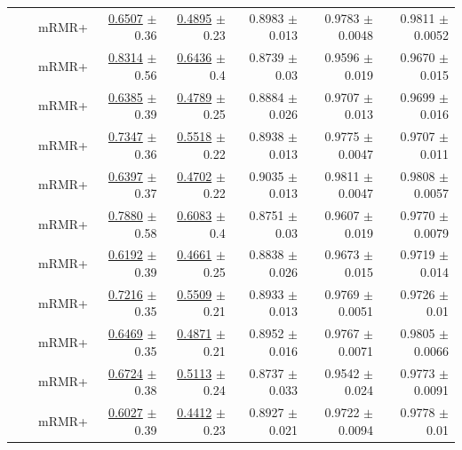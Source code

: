 \begin{longtable}{llp{}rrrrr}
 &  & mRMR+ & \underline{0.6507} {\scriptsize $\pm$ 0.36} & \underline{0.4895} {\scriptsize $\pm$ 0.23} & 0.8983 {\scriptsize $\pm$ 0.013} & 0.9783 {\scriptsize $\pm$ 0.0048} & 0.9811 {\scriptsize $\pm$ 0.0052} \\
 &  & mRMR+ & \underline{0.8314} {\scriptsize $\pm$ 0.56} & \underline{0.6436} {\scriptsize $\pm$ 0.4} & 0.8739 {\scriptsize $\pm$ 0.03} & 0.9596 {\scriptsize $\pm$ 0.019} & 0.9670 {\scriptsize $\pm$ 0.015} \\
 &  & mRMR+ & \underline{0.6385} {\scriptsize $\pm$ 0.39} & \underline{0.4789} {\scriptsize $\pm$ 0.25} & 0.8884 {\scriptsize $\pm$ 0.026} & 0.9707 {\scriptsize $\pm$ 0.013} & 0.9699 {\scriptsize $\pm$ 0.016} \\
 &  & mRMR+ & \underline{0.7347} {\scriptsize $\pm$ 0.36} & \underline{0.5518} {\scriptsize $\pm$ 0.22} & 0.8938 {\scriptsize $\pm$ 0.013} & 0.9775 {\scriptsize $\pm$ 0.0047} & 0.9707 {\scriptsize $\pm$ 0.011} \\
 &  & mRMR+ & \underline{0.6397} {\scriptsize $\pm$ 0.37} & \underline{0.4702} {\scriptsize $\pm$ 0.22} & 0.9035 {\scriptsize $\pm$ 0.013} & 0.9811 {\scriptsize $\pm$ 0.0047} & 0.9808 {\scriptsize $\pm$ 0.0057} \\
 &  & mRMR+ & \underline{0.7880} {\scriptsize $\pm$ 0.58} & \underline{0.6083} {\scriptsize $\pm$ 0.4} & 0.8751 {\scriptsize $\pm$ 0.03} & 0.9607 {\scriptsize $\pm$ 0.019} & 0.9770 {\scriptsize $\pm$ 0.0079} \\
 &  & mRMR+ & \underline{0.6192} {\scriptsize $\pm$ 0.39} & \underline{0.4661} {\scriptsize $\pm$ 0.25} & 0.8838 {\scriptsize $\pm$ 0.026} & 0.9673 {\scriptsize $\pm$ 0.015} & 0.9719 {\scriptsize $\pm$ 0.014} \\
 &  & mRMR+ & \underline{0.7216} {\scriptsize $\pm$ 0.35} & \underline{0.5509} {\scriptsize $\pm$ 0.21} & 0.8933 {\scriptsize $\pm$ 0.013} & 0.9769 {\scriptsize $\pm$ 0.0051} & 0.9726 {\scriptsize $\pm$ 0.01} \\
 &  & mRMR+ & \underline{0.6469} {\scriptsize $\pm$ 0.35} & \underline{0.4871} {\scriptsize $\pm$ 0.21} & 0.8952 {\scriptsize $\pm$ 0.016} & 0.9767 {\scriptsize $\pm$ 0.0071} & 0.9805 {\scriptsize $\pm$ 0.0066} \\
 &  & mRMR+ & \underline{0.6724} {\scriptsize $\pm$ 0.38} & \underline{0.5113} {\scriptsize $\pm$ 0.24} & 0.8737 {\scriptsize $\pm$ 0.033} & 0.9542 {\scriptsize $\pm$ 0.024} & 0.9773 {\scriptsize $\pm$ 0.0091} \\
 &  & mRMR+ & \underline{0.6027} {\scriptsize $\pm$ 0.39} & \underline{0.4412} {\scriptsize $\pm$ 0.23} & 0.8927 {\scriptsize $\pm$ 0.021} & 0.9722 {\scriptsize $\pm$ 0.0094} & 0.9778 {\scriptsize $\pm$ 0.01} \\

\end{longtable}
